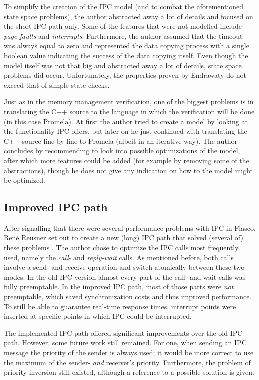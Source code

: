 To simplify the creation of the IPC model (and to combat the aforementioned state space problems), the author abstracted away a lot of details and focused on the short IPC path only. Some of the features that were not modelled include \emph{page-faults} and \emph{interrupts}. Furthermore, the author assumed that the timeout was always equal to zero and represented the data copying process with a single boolean value indicating the success of the data copying itself. Even though the model itself was not that big and abstracted away a lot of details, state space problems did occur. Unfortunately, the properties proven by Endrawaty do not exceed that of simple state checks.\emptyline

Just as in the memory management verification, one of the biggest problems is in translating the C++ source to the language in which the verification will be done (in this case Promela). At first the author tried to create a model by looking at the functionality IPC offers, but later on he just continued with translating the C++ source line-by-line to Promela (albeit in an iterative way). The author concludes by recommending to look into possible optimizations of the model, after which more features could be added (for example by removing some of the abstractions), though he does not give any indication on how to the model might be optimized.

\subsection{Improved IPC path}
After signalling that there were several performance problems with IPC in Fiasco, Ren\'e Reusner set out to create a new (long) IPC path that solved (several of) these problems \cite{reusner05impl}. The author chose to optimize the IPC calls most frequently used, namely the \emph{call}- and \emph{reply-wait} calls. As mentioned before, both calls involve a send- and receive operation and switch atomically between these two modes. In the old IPC version almost every part of the call- and wait calls was fully preemptable. In the improved IPC path, most of those parts were \textit{not} preemptable, which saved synchronization costs and thus improved performance. To still be able to guarantee real-time response times, interrupt points were inserted at specific points in which IPC could be interrupted.\emptyline

The implemented IPC path offered significant improvements over the old IPC path. However, some future work still remained. For one, when sending an IPC message the priority of the sender is always used; it would be more correct to use the maximum of the sender- \emph{and} receiver's priority. Furthermore, the problem of priority inversion still existed, although a reference to a possible solution is given.

